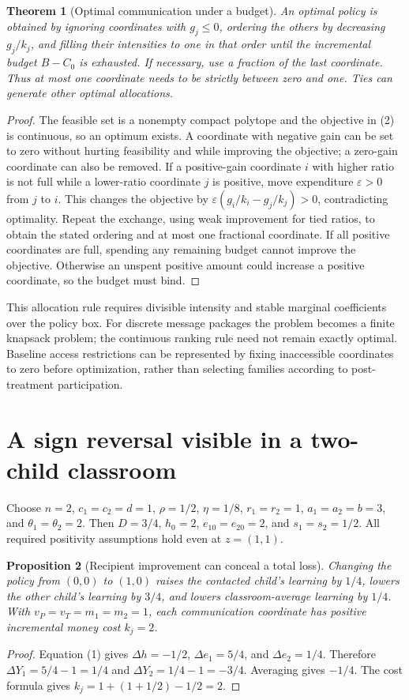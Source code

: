 \documentclass[11pt,a4paper]{article}
\newtheorem{theorem}{Theorem}[section]
\newtheorem{proposition}[theorem]{Proposition}
\theoremstyle{definition}
\theoremstyle{remark}
\begin{document}
\begin{theorem}[Optimal communication under a budget]
An optimal policy is obtained by ignoring coordinates with $g_j\leq0$, ordering the others by decreasing $g_j/k_j$, and filling their intensities to one in that order until the incremental budget $B-C_0$ is exhausted. If necessary, use a fraction of the last coordinate. Thus at most one coordinate needs to be strictly between zero and one. Ties can generate other optimal allocations.
\end{theorem}
\begin{proof}
The feasible set is a nonempty compact polytope and the objective in (2) is continuous, so an optimum exists. A coordinate with negative gain can be set to zero without hurting feasibility and while improving the objective; a zero-gain coordinate can also be removed. If a positive-gain coordinate $i$ with higher ratio is not full while a lower-ratio coordinate $j$ is positive, move expenditure $\varepsilon>0$ from $j$ to $i$. This changes the objective by $\varepsilon(g_i/k_i-g_j/k_j)>0$, contradicting optimality. Repeat the exchange, using weak improvement for tied ratios, to obtain the stated ordering and at most one fractional coordinate. If all positive coordinates are full, spending any remaining budget cannot improve the objective. Otherwise an unspent positive amount could increase a positive coordinate, so the budget must bind.
\end{proof}

This allocation rule requires divisible intensity and stable marginal coefficients over the policy box. For discrete message packages the problem becomes a finite knapsack problem; the continuous ranking rule need not remain exactly optimal. Baseline access restrictions can be represented by fixing inaccessible coordinates to zero before optimization, rather than selecting families according to post-treatment participation.

\section{A sign reversal visible in a two-child classroom}
Choose $n=2$, $c_1=c_2=d=1$, $\rho=1/2$, $\eta=1/8$, $r_1=r_2=1$, $a_1=a_2=b=3$, and $\theta_1=\theta_2=2$. Then $D=3/4$, $h_0=2$, $e_{10}=e_{20}=2$, and $s_1=s_2=1/2$. All required positivity assumptions hold even at $z=(1,1)$.

\begin{proposition}[Recipient improvement can conceal a total loss]
Changing the policy from $(0,0)$ to $(1,0)$ raises the contacted child's learning by $1/4$, lowers the other child's learning by $3/4$, and lowers classroom-average learning by $1/4$. With $v_P=v_T=m_1=m_2=1$, each communication coordinate has positive incremental money cost $k_j=2$.
\end{proposition}
\begin{proof}
Equation (1) gives $\Delta h=-1/2$, $\Delta e_1=5/4$, and $\Delta e_2=1/4$. Therefore $\Delta Y_1=5/4-1=1/4$ and $\Delta Y_2=1/4-1=-3/4$. Averaging gives $-1/4$. The cost formula gives $k_j=1+(1+1/2)-1/2=2$.
\end{proof}
\end{document}
